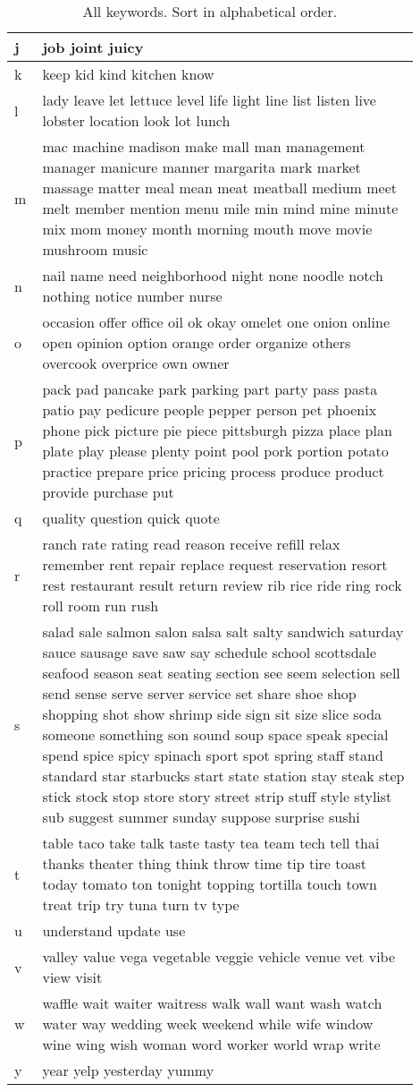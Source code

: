 \documentclass[11pt]{article}
\begin{document}
\begin{table}
\begin{tabular}{p{0.05\linewidth}p{0.85\linewidth}}
    \midrule
    j & job joint juicy \\
    \midrule
    k & keep kid kind kitchen know \\
    \midrule
    l & lady leave let lettuce level life light line list listen live lobster location look lot lunch \\
    \midrule
    m & mac machine madison make mall man management manager manicure manner margarita mark market massage matter meal mean meat meatball medium meet melt member mention menu mile min mind mine minute mix mom money month morning mouth move movie mushroom music \\
    \midrule
    n & nail name need neighborhood night none noodle notch nothing notice number nurse \\
    \midrule
    o & occasion offer office oil ok okay omelet one onion online open opinion option orange order organize others overcook overprice own owner \\
    \midrule
    p & pack pad pancake park parking part party pass pasta patio pay pedicure people pepper person pet phoenix phone pick picture pie piece pittsburgh pizza place plan plate play please plenty point pool pork portion potato practice prepare price pricing process produce product provide purchase put \\
    \midrule
    q & quality question quick quote \\
    \midrule
    r & ranch rate rating read reason receive refill relax remember rent repair replace request reservation resort rest restaurant result return review rib rice ride ring rock roll room run rush \\
    \midrule
    s & salad sale salmon salon salsa salt salty sandwich saturday sauce sausage save saw say schedule school scottsdale seafood season seat seating section see seem selection sell send sense serve server service set share shoe shop shopping shot show shrimp side sign sit size slice soda someone something son sound soup space speak special spend spice spicy spinach sport spot spring staff stand standard star starbucks start state station stay steak step stick stock stop store story street strip stuff style stylist sub suggest summer sunday suppose surprise sushi \\
    \midrule
    t & table taco take talk taste tasty tea team tech tell thai thanks theater thing think throw time tip tire toast today tomato ton tonight topping tortilla touch town treat trip try tuna turn tv type \\
    \midrule
    u & understand update use \\
    \midrule
    v & valley value vega vegetable veggie vehicle venue vet vibe view visit \\
    \midrule
    w & waffle wait waiter waitress walk wall want wash watch water way wedding week weekend while wife window wine wing wish woman word worker world wrap write \\
\midrule
    y & year yelp yesterday yummy \\
\bottomrule
    \end{tabular}
    \caption{All keywords. Sort in alphabetical order.}
    \label{tab:all_keywords}
\end{table}
 
\end{document}
